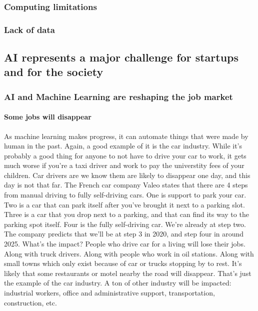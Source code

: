 \documentclass[12pt]{article}
\begin{document}
{\subsubsection{Computing limitations}

\subsubsection{Lack of data}

\subsection{AI represents a major challenge for startups and for the society}

\subsubsection{AI and Machine Learning are reshaping the job market}

\paragraph{Some jobs will disappear}

As machine learning makes progress, it can automate things that were made by
human in the past. Again, a good example of it is the car industry. While it's
probably a good thing for anyone to not have to drive your car to work, it gets
much worse if you're a taxi driver and work to pay the universtity fees of your
children. Car drivers are we know them are likely to disappear one day, and this
day is not that far.
The French car company Valeo states that there are 4 steps from manual driving
to fully self-driving cars. One is support to park your car. Two is a car that
can park itself after you've brought it next to a parking slot. Three is a car
that you drop next to a parking, and that can find its way to the parking spot
itself. Four is the fully self-driving car. We're already at step two. The company
predicts that we'll be at step 3 in 2020, and step four in around 2025.
What's the impact? People who drive car for a living will lose their jobs. Along
with truck drivers. Along with people who work in oil stations. Along with small
towns which only exist because of car or trucks stopping by to rest. It's likely
that some restaurants or motel nearby the road will disappear.
That's just the example of the car industry. A ton of other industry will be
impacted: industrial workers, office and administrative support, transportation,
construction, etc.

}
\end{document}

